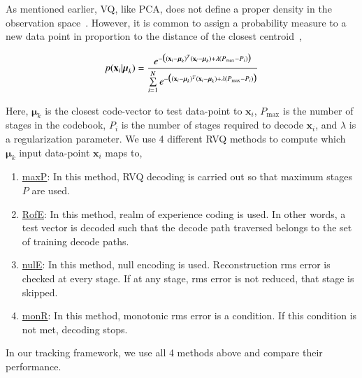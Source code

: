 \begin{Body}

As mentioned earlier, VQ, like PCA, does not define a proper density in the observation space~\cite{1999_JNL_Gaussian_roweis}.  However, it is common to assign a probability measure to a new data point in proportion to the distance of the closest centroid~\cite{1999_JNL_Gaussian_roweis},

\begin{equation}
p(\mathbf{x}_i|\boldsymbol\mu_k) = \frac{e^{-\big((\mathbf{x}_i-\boldsymbol\mu_k)^T(\mathbf{x}_i-\boldsymbol\mu_k) + \lambda({P_{\textrm{max}}-P_i})\big)}} {\sum\limits_{i=1}^N e^{-\big((\mathbf{x}_i-\boldsymbol\mu_k)^T(\mathbf{x}_i-\boldsymbol\mu_k) + \lambda({P_{\textrm{max}}-P_i})\big)}}
\end{equation}

Here, $\boldsymbol\mu_k$ is the closest code-vector to test data-point to $\mathbf{x}_i$,  $P_{\textrm{max}}$ is the number of stages in the codebook, $P_i$ is the number of stages required to decode $\mathbf{x}_i$, and $\lambda$ is a regularization parameter.  We use 4 different RVQ methods to compute which $\boldsymbol \mu_k$ input data-point $\mathbf{x}_i$ maps to,

\begin{enumerate}
\item \underline{maxP}: In this method, RVQ decoding is carried out so that maximum stages $P$ are used.
\item \underline{RofE}: In this method, realm of experience coding is used.  In other words, a test vector is decoded such that the decode path traversed belongs to the set of training decode paths.
\item \underline{nulE}: In this method, null encoding is used.  Reconstruction rms error is checked at every stage.  If at any stage, rms error is not reduced, that stage is skipped.
\item \underline{monR}: In this method, monotonic rms error is a condition.  If this condition is not met, decoding stops.
\end{enumerate}

In our tracking framework, we use all 4 methods above and compare their performance. 


\end{Body}
